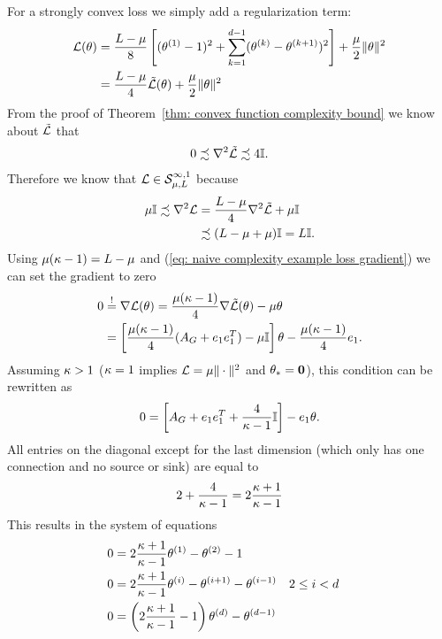 For a strongly convex loss we simply add a regularization term:
%
\begin{align*}
	\Loss(\weights)
	&= \frac{\ubound -\lbound}{8} \left[
		(\weights^{(1)}-1)^2
		+ \sum_{k=1}^{\dimension-1} (\weights^{(k)}-\weights^{(k+1)})^2
	\right]
	+ \frac\lbound{2} \| \weights \|^2\\
	&= \frac{\ubound - \lbound}{4} \tilde{\Loss}(\weights)
	+ \frac{\lbound}{2}\| \weights \|^2
\end{align*}
%
From the proof of Theorem~\ref{thm: convex function complexity bound} we know
about \(\tilde{\Loss}\) that
%
\begin{align*}
	0 \precsim \nabla^2\tilde{\Loss} \precsim 4\identity.
\end{align*}
%
Therefore we know that \(\Loss\in\strongConvex[\infty,1]{\lbound}{\ubound}\) because
%
\begin{align*}
	\lbound\identity
	\precsim \nabla^2\Loss
	&= \frac{\ubound - \lbound}{4} \nabla^2 \tilde{\Loss} + \lbound\identity\\
	&\precsim (\ubound - \lbound + \lbound)\identity = \ubound \identity.
\end{align*}
%
Using \(\lbound(\condition -1)=\ubound-\lbound\) and (\ref{eq: naive complexity
example loss gradient}) we can set the gradient to zero
\begin{align*}
	0 &\lxeq{!} \nabla \Loss(\weights)
	=  \frac{\lbound(\condition -1)}{4} \nabla\tilde{\Loss}(\weights) - \lbound \weights\\
	&= \left[
		\frac{\lbound(\condition-1)}{4}(A_G + \stdBasis_1\stdBasis_1^T) - \lbound\identity
	\right]\weights - \frac{\lbound(\condition-1)}{4}\stdBasis_1.
\end{align*}
%
Assuming \(\condition>1\) (\(\condition=1\) implies \(\Loss=\lbound\|\cdot\|^2\) and
\(\minimum=\mathbf{0}\)),
this condition can be rewritten as
%
\begin{align*}
	0 =  \left[
		A_G + \stdBasis_1\stdBasis_1^T + \frac{4}{\condition-1}\identity
	\right] - \stdBasis_1
	\weights.
\end{align*}
%
All entries on the diagonal except for the last dimension (which only has one
connection and no source or sink) are equal to
%
\begin{align*}
	2+\frac{4}{\condition-1} = 2\frac{\condition +1}{\condition-1}
\end{align*}
%
This results in the system of equations
%
\begin{subequations}
\label{eq: solution to the strongly convex coloring problem}
\begin{align*}
	0&=2\frac{\condition+1}{\condition -1}\weights^{(1)} - \weights^{(2)} -1 \\
	0&=2\frac{\condition+1}{\condition -1}\weights^{(i)}
	- \weights^{(i+1)} - \weights^{(i-1)}  && 2\le i <d \\
	0&= \left(2\frac{\condition+1}{\condition -1} -1 \right)\weights^{(d)}
	- \weights^{(d-1)}
\end{align*}
\end{subequations}
